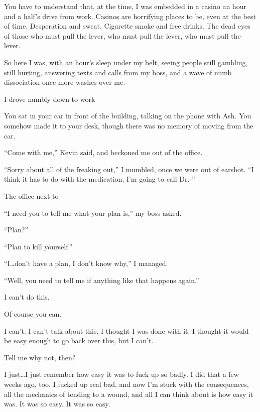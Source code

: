 \begin{paracol}{2}
\begin{leftcolumn}
You have to understand that, at the time, I was embedded in a casino an hour and a half's drive from work. Casinos are horrifying places to be, even at the best of time. Desperation and sweat. Cigarette smoke and free drinks. The dead eyes of those who must pull the lever, who must pull the lever, who must pull the lever.

So here I was, with an hour's sleep under my belt, seeing people still gambling, still hurting, answering texts and calls from my boss, and a wave of numb dissociation once more washes over me.

I drove numbly down to work

\begin{ally}
You sat in your car in front of the building, talking on the phone with Ash. You somehow made it to your desk, though there was no memory of moving from the car.
\end{ally}
``Come with me,'' Kevin said, and beckoned me out of the office.

``Sorry about all of the freaking out,'' I mumbled, once we were out of earshot. ``I think it has to do with the medication, I'm going to call Dr.-''

\begin{ally}
The office next to
\end{ally}
``I need you to tell me what your plan is,'' my boss asked.

``Plan?''

``Plan to kill yourself.''

``I\ldots{}don't have a plan, I don't know why,'' I managed.

``Well, you need to tell me if anything like that happens again.''
\newpage

\noindent I can't do this.

\begin{ally}
Of course you can.
\end{ally}
I can't. I can't talk about this. I thought I was done with it. I thought it would be easy enough to go back over this, but I can't.

\begin{ally}
Tell me why not, then?
\end{ally}
I just\ldots{}I just remember how easy it was to fuck up so badly. I did that a few weeks ago, too. I fucked up real bad, and now I'm stuck with the consequences, all the mechanics of tending to a wound, and all I can think about is how easy it was. It was so easy. It was so easy.


\end{leftcolumn}
\end{paracol}
